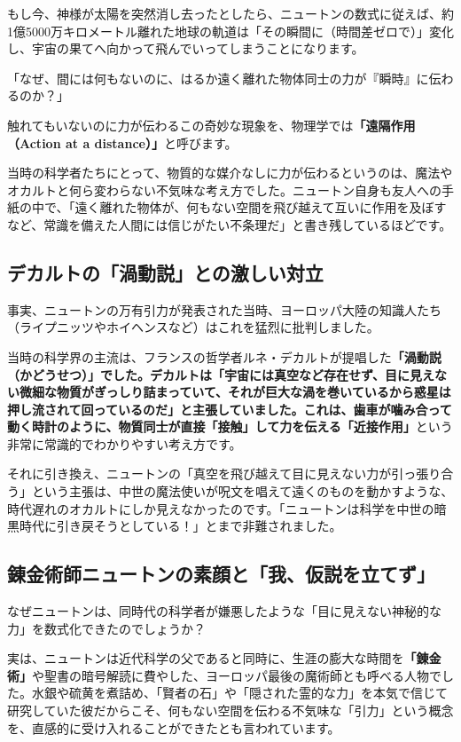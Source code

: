 もし今、神様が太陽を突然消し去ったとしたら、ニュートンの数式に従えば、約1億5000万キロメートル離れた地球の軌道は「その瞬間に（時間差ゼロで）」変化し、宇宙の果てへ向かって飛んでいってしまうことになります。

「なぜ、間には何もないのに、はるか遠く離れた物体同士の力が『瞬時』に伝わるのか？」

触れてもいないのに力が伝わるこの奇妙な現象を、物理学では\textbf{「遠隔作用（Action at a distance）」}と呼びます。

当時の科学者たちにとって、物質的な媒介なしに力が伝わるというのは、魔法やオカルトと何ら変わらない不気味な考え方でした。ニュートン自身も友人への手紙の中で、「遠く離れた物体が、何もない空間を飛び越えて互いに作用を及ぼすなど、常識を備えた人間には信じがたい不条理だ」と書き残しているほどです。

\subsection{デカルトの「渦動説」との激しい対立}

事実、ニュートンの万有引力が発表された当時、ヨーロッパ大陸の知識人たち（ライプニッツやホイヘンスなど）はこれを猛烈に批判しました。

当時の科学界の主流は、フランスの哲学者ルネ・デカルトが提唱した\textbf{「渦動説（かどうせつ）」でした。デカルトは「宇宙には真空など存在せず、目に見えない微細な物質がぎっしり詰まっていて、それが巨大な渦を巻いているから惑星は押し流されて回っているのだ」と主張していました。これは、歯車が噛み合って動く時計のように、物質同士が直接「接触」して力を伝える「近接作用」}という非常に常識的でわかりやすい考え方です。

それに引き換え、ニュートンの「真空を飛び越えて目に見えない力が引っ張り合う」という主張は、中世の魔法使いが呪文を唱えて遠くのものを動かすような、時代遅れのオカルトにしか見えなかったのです。「ニュートンは科学を中世の暗黒時代に引き戻そうとしている！」とまで非難されました。

\subsection{錬金術師ニュートンの素顔と「我、仮説を立てず」}

なぜニュートンは、同時代の科学者が嫌悪したような「目に見えない神秘的な力」を数式化できたのでしょうか？

実は、ニュートンは近代科学の父であると同時に、生涯の膨大な時間を\textbf{「錬金術」}や聖書の暗号解読に費やした、ヨーロッパ最後の魔術師とも呼べる人物でした。水銀や硫黄を煮詰め、「賢者の石」や「隠された霊的な力」を本気で信じて研究していた彼だからこそ、何もない空間を伝わる不気味な「引力」という概念を、直感的に受け入れることができたとも言われています。

